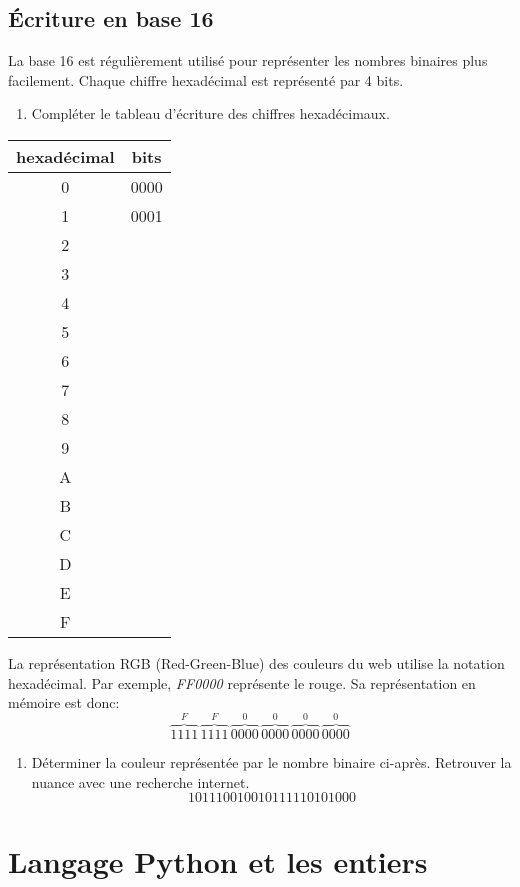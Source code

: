 \documentclass[a4paper,11pt]{article}
\begin{document}
\begin{Form}
\subsection{Écriture en base 16}
La base 16 est régulièrement utilisé pour représenter les nombres binaires plus facilement. Chaque chiffre hexadécimal est représenté par 4 bits.
\begin{activite}
\begin{enumerate}
\item Compléter le tableau d'écriture des chiffres hexadécimaux.
\end{enumerate}
\begin{center}
\begin{tabular}{|c|c|}
\hline 
hexadécimal & bits \\ 
\hline 
0 & 0000 \\ 
\hline 
1 & 0001 \\ 
\hline 
2 &  \\ 
\hline 
3 &  \\ 
\hline 
4 &  \\ 
\hline 
5 &  \\ 
\hline 
6 &  \\ 
\hline 
7 &  \\ 
\hline 
8 &  \\ 
\hline 
9 &  \\ 
\hline 
A &  \\ 
\hline 
B &  \\ 
\hline 
C &  \\ 
\hline 
D &  \\ 
\hline 
E &  \\ 
\hline 
F &  \\ 
\hline 
\end{tabular} 
\end{center}
La représentation RGB (Red-Green-Blue) des couleurs du web utilise la notation hexadécimal. Par exemple, \emph{FF0000} représente le rouge. Sa représentation en mémoire est donc: $$\overbrace{1111}^{F}\,\overbrace{1111}^{F}\,\overbrace{0000}^{0}\,\overbrace{0000}^{0}\,\overbrace{0000}^{0}\,\overbrace{0000}^{0}$$
\begin{enumerate}[resume]
\item Déterminer la couleur représentée par le nombre binaire ci-après. Retrouver la nuance avec une recherche internet.
$$101110010010111110101000$$
\end{enumerate}
\end{activite}
\section{Langage Python et les entiers}

\end{Form}
\end{document}
